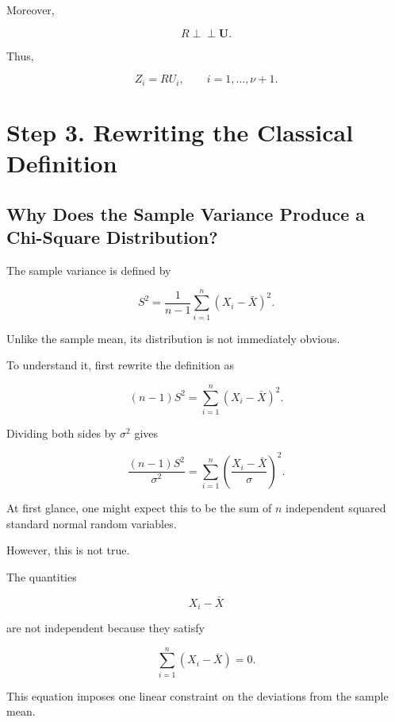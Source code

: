 \documentclass[11pt]{article}
\begin{document}
	Moreover,
	
	\[
	R
	\perp\!\!\!\perp
	\mathbf U.
	\]
	
	Thus,
	
	\[
	Z_i
	=
	RU_i,
	\qquad
	i=1,\ldots,\nu+1.
	\]
	
	
	\section{Step 3. Rewriting the Classical Definition}
	
	\begin{mdframed}[
		linewidth=0.8pt,
		roundcorner=6pt,
		backgroundcolor=gray!5,
		linecolor=gray!60,
		innertopmargin=10pt,
		innerbottommargin=10pt,
		innerleftmargin=10pt,
		innerrightmargin=10pt
		]
		
		\subsection*{Why Does the Sample Variance Produce a Chi-Square Distribution?}
		
		The sample variance is defined by
		
		\[
		S^2
		=
		\frac1{n-1}
		\sum_{i=1}^{n}
		(X_i-\bar X)^2.
		\]
		
		Unlike the sample mean, its distribution is not immediately obvious.
		
		To understand it, first rewrite the definition as
		
		\[
		(n-1)S^2
		=
		\sum_{i=1}^{n}
		(X_i-\bar X)^2.
		\]
		
		Dividing both sides by $\sigma^2$ gives
		
		\[
		\frac{(n-1)S^2}{\sigma^2}
		=
		\sum_{i=1}^{n}
		\left(
		\frac{X_i-\bar X}{\sigma}
		\right)^2.
		\]
		
		At first glance, one might expect this to be the sum of $n$
		independent squared standard normal random variables.
		
		However, this is not true.
		
		The quantities
		
		\[
		X_i-\bar X
		\]
		
		are not independent because they satisfy
		
		\[
		\sum_{i=1}^{n}
		(X_i-\bar X)=0.
		\]
		
		This equation imposes one linear constraint on the deviations from the
		sample mean.
		

\end{mdframed}
\end{document}
